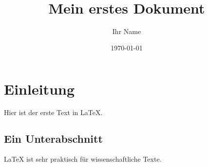 \documentclass{article} %
\title{Mein erstes Dokument}
\author{Ihr Name}
\date{\today}
\begin{document}
\maketitle %

\section{Einleitung}
Hier ist der erste Text in LaTeX.

\subsection{Ein Unterabschnitt}
\LaTeX{} ist sehr praktisch für wissenschaftliche Texte.
\end{document}
